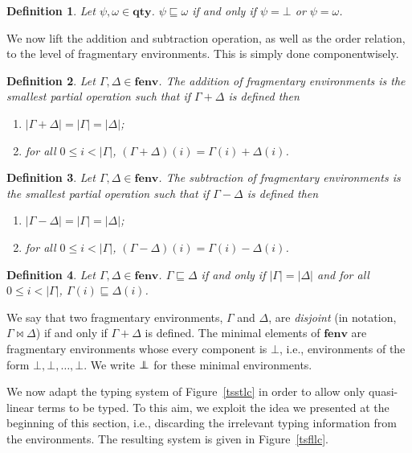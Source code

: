 \documentclass[submission,creativecommons]{eptcs}
\newtheorem{definition}{Definition}
\newcommand{\bt}{{\scriptstyle\bot}}
\newcommand{\qty}{\mathord{\mathbf{qty}}}
\newcommand{\fenv}{\mathord{\mathbf{fenv}}}
\newcommand{\minenv}{\mathord{\bot\hspace{-1.55ex}\bot}}
\begin{document}
\begin{definition}
Let $\psi, \omega \in \qty$. $\psi\sqsubseteq\omega$ if and only if $\psi=\bot$ or $\psi=\omega$.
\end{definition}

We now lift the addition and subtraction operation, as well as the order relation, to the level of fragmentary
environments. This is simply done componentwisely.

\begin{definition}
Let $\Gamma, \Delta \in \fenv$.
The addition of fragmentary environments is the smallest partial operation such that if $\Gamma + \Delta$ is defined then
\begin{enumerate}[label={\rm \roman*.}, labelsep*=2ex, itemsep=0pt]
  \item $|\Gamma + \Delta| = |\Gamma| = |\Delta|$;
  \item for all $0\leq i < |\Gamma|$, $(\Gamma + \Delta)(i) = \Gamma(i) + \Delta(i)$.
\end{enumerate}
\end{definition}

\begin{definition}
Let $\Gamma, \Delta \in \fenv$.
The subtraction of fragmentary environments is the smallest partial operation such that if $\Gamma - \Delta$ is defined then
\begin{enumerate}[label={\rm \roman*.}, labelsep*=2ex, itemsep=0pt]
  \item $|\Gamma - \Delta| = |\Gamma| = |\Delta|$;
  \item for all $0\leq i < |\Gamma|$, $(\Gamma - \Delta)(i) = \Gamma(i) - \Delta(i)$.
\end{enumerate}
\end{definition}

\begin{definition}
Let $\Gamma, \Delta \in \fenv$. $\Gamma\sqsubseteq\Delta$ if and only if
$|\Gamma| = |\Delta|$ and for all $0\leq i < |\Gamma|$, $\Gamma(i) \sqsubseteq \Delta(i)$.
\end{definition}

We say that two fragmentary environments, $\Gamma$ and $\Delta$, are \emph{disjoint}
(in notation, $\Gamma\bowtie\Delta$) if and only if $\Gamma+\Delta$ is defined.
The minimal elements of $\fenv$ are fragmentary environments whose every component is $\bt$, i.e.,
environments of the form $\bt,\bt,\ldots,\bt$. We write $\mathbf{\minenv}$ for these minimal environments.

We now adapt the typing system of Figure~\ref{tsstlc} in order to allow only quasi-linear terms to be typed.
To this aim, we exploit the idea we presented at the beginning of this section, i.e., discarding the irrelevant
typing information from the environments. The resulting system is given in Figure~\ref{tsfllc}.
\end{document}
